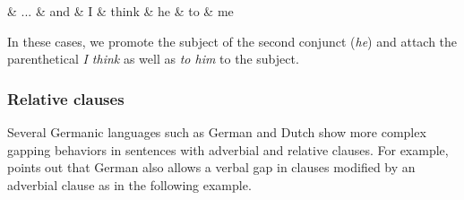 \documentclass[lucida,biblatex]{sp} %
\newcounter{excounter}
\begin{document}
\begin{exe}
  \setcounter{xnumi}{\value{excounter}}
\end{exe}
\begin{center}
\footnotesize
  \label{ex:en-gap-10}
  \footnotesize
  \begin{dependency}[edge unit distance=2.5ex]
    \begin{deptext}[column sep=0.4cm]
      \& ... \& and \& I \& think \& he \& to \& me \\
    \end{deptext}
  \end{dependency}
\end{center}
In these cases, we promote the subject of the second conjunct (\textit{he}) 
and attach the parenthetical \textit{I think} as well as \textit{to him} to the subject.


\subsubsection{Relative clauses}






Several Germanic languages such as German and Dutch show more complex gapping behaviors in sentences with adverbial and relative clauses. For example, \citet{Wyngaerd2007} points out that German also allows a verbal gap in clauses modified by an adverbial clause as in the following example. 
\end{document}
